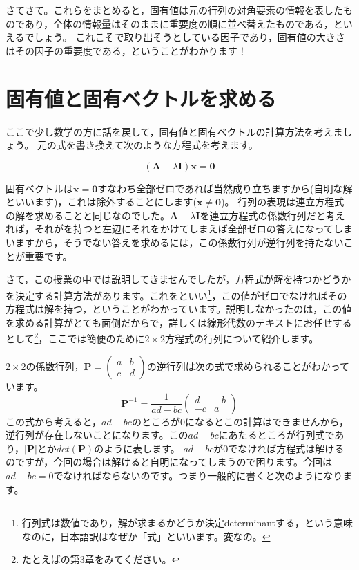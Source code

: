 \documentclass{ltjsbook}
\begin{document}
さてさて。これらをまとめると，固有値は元の行列の対角要素の情報を表したものであり，全体の情報量はそのままに重要度の順に並べ替えたものである，といえるでしょう。
これこそで取り出そうとしている因子であり，固有値の大きさはその因子の重要度である，ということがわかります！

\section{固有値と固有ベクトルを求める}
ここで少し数学の方に話を戻して，固有値と固有ベクトルの計算方法を考えましょう。
元の式を書き換えて次のような方程式を考えます。

\[ (\bm{A} - \lambda\bm{I})\bm{x} = \bm{0} \]

固有ベクトルは$\bm{x}=\bm{0}$すなわち全部ゼロであれば当然成り立ちますから(自明な解といいます)，これは除外することにします($\bm{x}\neq \bm{0}$)。
行列の表現は連立方程式の解を求めることと同じなのでした。$\bm{A} - \lambda\bm{I}$を連立方程式の係数行列だと考えれば，それがを持つと左辺にそれをかけてしまえば全部ゼロの答えになってしまいますから，そうでない答えを求めるには，この係数行列が逆行列を持たないことが重要です。

さて，この授業の中では説明してきませんでしたが，方程式が解を持つかどうかを決定する計算方法があります。これをといい\footnote{行列式は数値であり，解が求まるかどうか決定determinantする，という意味なのに，日本語訳はなぜか「式」といいます。変なの。}，この値がゼロでなければその方程式は解を持つ，ということがわかっています。説明しなかったのは，この値を求める計算がとても面倒だからで，詳しくは線形代数のテキストにお任せするとして\footnote{たとえば\citet{Murakami20160301}の第3章をみてください。}，ここでは簡便のために$2\times2$方程式の行列について紹介します。

$2 \times 2$の係数行列，$\bm{P}=\begin{pmatrix} a&b\\c&d \end{pmatrix}$の逆行列は次の式で求められることがわかっています。
\[ \bm{P}^{-1}= \frac{1}{ad-bc}\begin{pmatrix}d & -b \\ -c &a \end{pmatrix} \]
この式から考えると，$ad - bc$のところが0になるとこの計算はできませんから，逆行列が存在しないことになります。この$ad-bc$にあたるところが行列式であり，$|\bm{P}|$とか$det(\bm{P})$のように表します。
$ad-bc$が0でなければ方程式は解けるのですが，今回の場合は解けると自明になってしまうので困ります。今回は$ad-bc=0$でなければならないのです。つまり一般的に書くと次のようになります。
\end{document}
